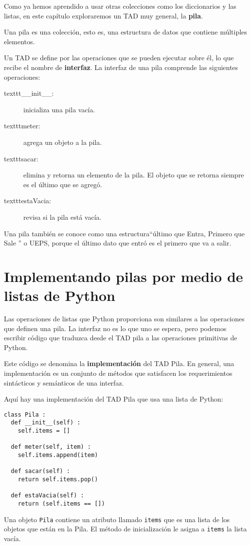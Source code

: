   

Como ya hemos aprendido a usar otras colecciones como los diccionarios
y las listas, en este capítulo exploraremos un TAD muy general, la
\textbf{pila}.

Una pila es una colección, esto es, una estructura de datos que contiene
múltiples elementos. 

Un TAD se define por las operaciones que se pueden ejecutar sobre
él, lo que recibe el nombre de \textbf{interfaz}. La interfaz de una
pila comprende las siguientes operaciones:
\begin{description}
\item [{texttt{\_\_init\_\_}:}] inicializa una pila vacía.
\item [{texttt{meter}:}] agrega un objeto a la pila.
\item [{texttt{sacar}:}] elimina y retorna un elemento de la pila. El
objeto que se retorna siempre es el último que se agregó.
\item [{texttt{estaVacia}:}] revisa si la pila está vacía.
\end{description}
Una pila también se conoce como una estructura``último que Entra,
Primero que Sale '' o UEPS, porque el último dato que entró es el
primero que va a salir.

\section{Implementando pilas por medio de listas de Python}

  

Las operaciones de listas que Python proporciona son similares a las
operaciones que definen una pila. La interfaz no es lo que uno se
espera, pero podemos escribir código que traduzca desde el TAD pila
a las operaciones primitivas de Python.

Este código se denomina la \textbf{implementación} del TAD Pila. En
general, una implementación es un conjunto de métodos que satisfacen
los requerimientos sintácticos y semánticos de una interfaz.

Aquí hay una implementación del TAD Pila que usa una lista de Python:

\beforeverb 
\begin{verbatim}
class Pila :
  def __init__(self) :
    self.items = []

  def meter(self, item) :
    self.items.append(item)

  def sacar(self) :
    return self.items.pop()

  def estaVacia(self) :
    return (self.items == [])
\end{verbatim}
\afterverb Una objeto \texttt{Pila} contiene un atributo llamado
\texttt{items} que es una lista de los objetos que están en la Pila.
El método de inicialización le asigna a \texttt{items} la lista vacía.

